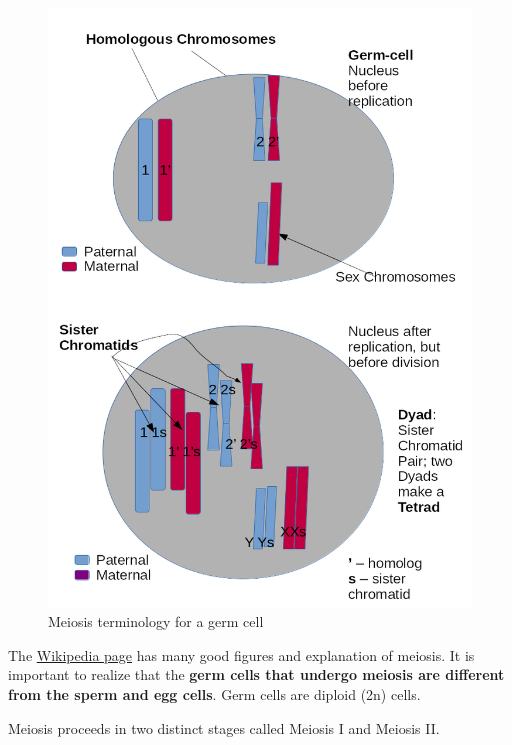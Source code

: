 \documentclass[12pt]{article}
\begin{document}
\begin{figure}[h!]
    \centering
    \includegraphics[scale=0.3]{meiosis-1.png}
    \caption{Meiosis terminology for a germ cell}
    \label{fig: meiosis-1}
\end{figure}

\newpage

The \href{https://upload.wikimedia.org/wikipedia/commons/7/74/Meiosis_Stages.svg}{Wikipedia page} has many good figures and explanation of meiosis. It is important to realize that the \textbf{germ cells that undergo meiosis are different from the sperm and egg cells}. Germ cells are diploid (2n) cells. 

Meiosis proceeds in two distinct stages called Meiosis I and Meiosis II.
\end{document}
